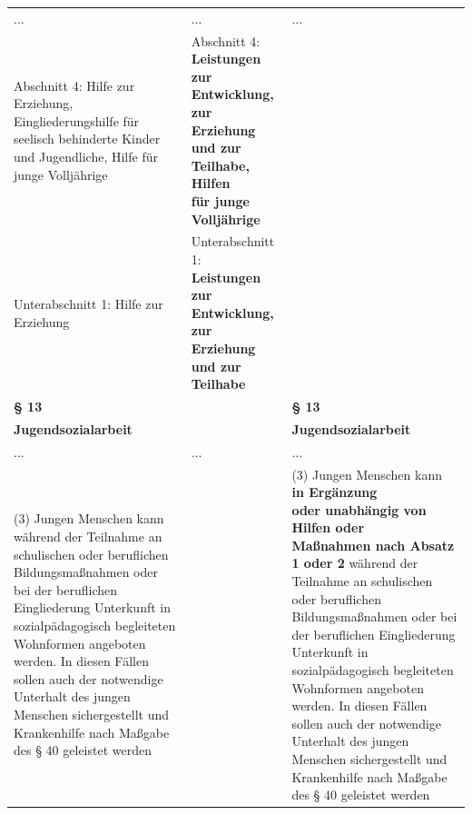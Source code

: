 \documentclass[10pt,a4paper,landscape]{article}
\begin{document}
\begin{longtable}{|L{8.2cm}|L{8.2cm}|L{8.2cm}|}
\hhline{|---|}
... & ... & ... \\
\hhline{|---|}
Abschnitt 4:   \newline Hilfe zur Erziehung, Eingliederungshilfe für  \newline seelisch behinderte Kinder und  \newline Jugendliche, Hilfe für junge Volljährige & Abschnitt 4:   \newline \textbf{\textcolor{diffred}{Leistungen zur Entwicklung, zur  \newline Erziehung und zur Teilhabe, Hilfen  \newline für junge Volljährige}} &  \\
\hhline{|---|}
Unterabschnitt 1:   \newline Hilfe zur Erziehung & Unterabschnitt 1:\textbf{\textcolor{diffred}{   \newline Leistungen zur Entwicklung, zur  \newline Erziehung und zur Teilhabe  }} &  \\
\hhline{|---|}
\textbf{\S{} 13} &  & \textbf{\S{} 13} \\
\hhline{|---|}
\textbf{Jugendsozialarbeit} &  & \textbf{Jugendsozialarbeit} \\
\hhline{|---|}
... & ... & ... \\
\hhline{|---|}
(3) Jungen Menschen kann während der  \newline Teilnahme an schulischen oder beruflichen  \newline Bildungsmaßnahmen oder bei der  \newline beruflichen Eingliederung Unterkunft in  \newline sozialpädagogisch begleiteten  \newline Wohnformen angeboten werden. In diesen  \newline Fällen sollen auch der notwendige  \newline Unterhalt des jungen Menschen  \newline sichergestellt und Krankenhilfe nach  \newline Maßgabe des \S{} 40 geleistet werden &  & (3) Jungen Menschen kann \textbf{\textcolor{diffgreen}{in Ergänzung  \newline oder unabhängig von Hilfen oder  \newline Maßnahmen nach Absatz 1 oder 2}} während der Teilnahme an schulischen  \newline oder beruflichen Bildungsmaßnahmen oder  \newline bei der beruflichen Eingliederung  \newline Unterkunft in sozialpädagogisch  \newline begleiteten Wohnformen angeboten  \newline werden. In diesen Fällen sollen auch der  \newline notwendige Unterhalt des jungen  \newline Menschen sichergestellt und Krankenhilfe  \newline nach Maßgabe des \S{} 40 geleistet werden \\

\end{longtable}
\end{document}
